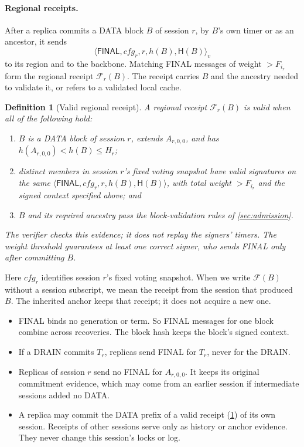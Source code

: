 \documentclass[11pt,a4paper]{article}
\newcommand{\FC}{\mathcal F}
\newcommand{\Hash}{\mathsf H}
\newcommand{\tagg}[1]{\ensuremath{\mathsf{#1}}}
\newtheorem{definition}{Definition}[section]
\begin{document}
\paragraph{Regional receipts.}
After a replica commits a DATA block $B$ of session $r$, by $B$'s own
timer or as an ancestor, it sends
\[
 \langle\tagg{FINAL},\mathit{cfg}_r,r,h(B),\Hash(B)\rangle_v
\]
to its region and to the backbone. Matching FINAL messages of weight
$>F_{i_r}$ form the regional receipt $\FC_r(B)$. The receipt carries $B$ and the ancestry needed to validate it, or
refers to a validated local cache.

\begin{definition}[Valid regional receipt]
\label{def:receipt}
A regional receipt $\FC_r(B)$ is valid when all of the following hold:
\begin{enumerate}[label=(\roman*)]
\item $B$ is a DATA block of session $r$, extends $A_{r,0,0}$, and has
$h(A_{r,0,0})<h(B)\le H_r$;
\item distinct members in session $r$'s fixed voting snapshot have
valid signatures on the same
$\langle\tagg{FINAL},\mathit{cfg}_r,r,h(B),\Hash(B)\rangle$,
with total weight $>F_{i_r}$ and the signed context specified above; and
\item $B$ and its required ancestry pass the block-validation rules of
\cref{sec:admission}.
\end{enumerate}
The verifier checks this evidence; it does not replay the signers'
timers. The weight threshold guarantees at least one correct signer,
who sends FINAL only after committing $B$.
\end{definition}
Here $\mathit{cfg}_r$ identifies session $r$'s fixed voting snapshot.
When we write $\FC(B)$ without a session subscript, we mean the receipt
from the session that produced $B$. The inherited anchor keeps that
receipt; it does not acquire a new one.
\begin{itemize}
\item FINAL binds no generation or term. So FINAL messages for one block
combine across recoveries. The block hash keeps the block's signed
context.
\item If a DRAIN commits $T_r$, replicas send FINAL for $T_r$, never for
the DRAIN.
\item Replicas of session $r$ send no FINAL for $A_{r,0,0}$. It keeps its original commitment evidence, which may come from an
earlier session if intermediate sessions added no DATA.
\item A replica may commit the DATA prefix of a valid receipt
(\cref{def:receipt}) of its own session. Receipts of other sessions serve only as history or anchor
evidence. They never change this session's locks or log.
\end{itemize}
\end{document}
